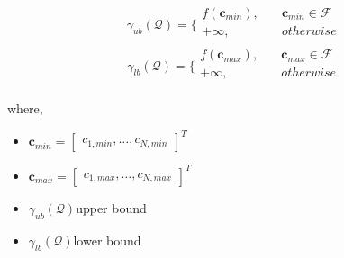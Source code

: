 \documentclass[usenames,dvipsnames]{beamer}
\begin{document}
\begin{frame}{\phantom{Tp}}
  \begin{exampleblock}{\phantom{Tp}}
   \[
     \gamma_{ub}(\mathcal{Q}) = \Bigg\{\begin{array}{ll}f(\mathbf{c}_{min}),\quad &\mathbf{c}_{min}\in\mathcal{F}\\+\infty,\quad &otherwise\\\end{array}	
    \]
    \[
     \gamma_{lb}(\mathcal{Q}) = \Bigg\{\begin{array}{ll}f(\mathbf{c}_{max}),\quad &\mathbf{c}_{max}\in\mathcal{F}\\+\infty,\quad &otherwise\\\end{array}	
     \]
  \end{exampleblock}
  where,
  \begin{itemize}
    \item $\mathbf{c}_{min} = \begin{bmatrix}c_{1,min},\dots,c_{N,min}\end{bmatrix}^T$
    \item $\mathbf{c}_{max} = \begin{bmatrix}c_{1,max},\dots,c_{N,max}\end{bmatrix}^T$
    \item $\gamma_{ub}(\mathcal{Q})$\quad upper bound
    \item $\gamma_{lb}(\mathcal{Q})$\quad lower bound
  \end{itemize}
\end{frame}
\end{document}
